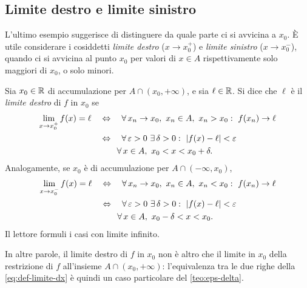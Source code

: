 \subsection{Limite destro e limite sinistro}

L'ultimo esempio suggerisce di distinguere da quale parte ci si avvicina a $x_{0}$. È utile
considerare i cosiddetti \emph{limite destro} ($x\to x_{0}^{+}$) e \emph{limite
sinistro} ($x\to x_{0}^{-}$), quando ci si avvicina al punto $x_{0}$ per valori di
$x\in A$ rispettivamente solo maggiori di $x_{0}$, o solo minori.

\begin{definizione}\label{def:limite-dx-sx}
Sia $x_{0}\in\mathbb{R}$ di accumulazione per $A\cap(x_{0},+\infty)$, e sia $\ell\in\mathbb{R}$. Si dice
che $\ell$ è il \emph{limite destro} di $f$ in $x_{0}$ se
\begin{equation}\label{eq:def-limite-dx}
\begin{aligned}
  \lim_{x\to x_{0}^{+}}f(x)=\ell \quad&\sse\quad \perogni x_{n}\to x_{0},\ x_{n}\in A,\ x_{n}>x_{0}:\ f(x_{n})\to\ell\\
  &\sse\quad \perogni\epsilon>0\ \esiste\delta>0 :\ \abs{f(x)-\ell}<\epsilon\\
  &\phantom{\sse}\quad \perogni x\in A,\ x_{0}<x<x_{0}+\delta .
\end{aligned}
\end{equation}
Analogamente, se $x_{0}$ è di accumulazione per $A\cap(-\infty,x_{0})$,
\begin{equation}\label{eq:def-limite-sx}
\begin{aligned}
  \lim_{x\to x_{0}^{-}}f(x)=\ell \quad&\sse\quad \perogni x_{n}\to x_{0},\ x_{n}\in A,\ x_{n}<x_{0}:\ f(x_{n})\to\ell\\
  &\sse\quad \perogni\epsilon>0\ \esiste\delta>0 :\ \abs{f(x)-\ell}<\epsilon\\
  &\phantom{\sse}\quad \perogni x\in A,\ x_{0}-\delta<x<x_{0} .
\end{aligned}
\end{equation}
Il lettore formuli i casi con limite infinito.
\end{definizione}

In altre parole, il limite destro di $f$ in $x_{0}$ non è altro che il limite in $x_{0}$
della restrizione di $f$ all'insieme $A\cap(x_{0},+\infty)$: l'equivalenza tra le due
righe della \eqref{eq:def-limite-dx} è quindi un caso particolare del \cref{teo:eps-delta}.

